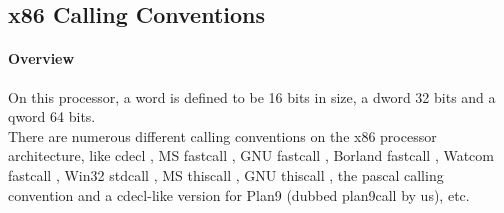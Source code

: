 %
%
%
%

\subsection{x86 Calling Conventions}


\paragraph{Overview}

On this processor, a word is defined to be 16 bits in size, a dword 32 bits
and a qword 64 bits.\\

There are numerous different calling conventions on the x86 processor
architecture, like cdecl \cite{x86cdecl}, MS fastcall \cite{x86Winfastcall}, GNU
fastcall \cite{x86GNUfastcall}, Borland fastcall \cite{x86Borlandfastcall}, Watcom
fastcall \cite{x86Watcomfastcall}, Win32 stdcall \cite{x86Winstdcall}, MS thiscall
\cite{x86Winthiscall}, GNU thiscall \cite{x86GNUthiscall}, the pascal calling
convention \cite{x86Pascal} and a cdecl-like version for Plan9 \cite{x86Plan9}
(dubbed plan9call by us), etc.\\

